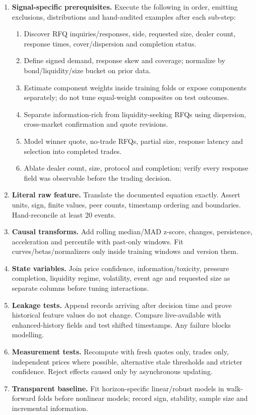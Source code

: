\documentclass[10pt]{article}
\begin{document}
\begin{enumerate}[leftmargin=2em,label=\textbf{A\arabic*.}]
\item \textbf{Signal-specific prerequisites.} Execute the following in order, emitting exclusions, distributions and hand-audited examples after each sub-step:
\begin{enumerate}[label=\alph*)]
\item Discover RFQ inquiries/responses, side, requested size, dealer count, response times, cover/dispersion and completion status.
\item Define signed demand, response skew and coverage; normalize by bond/liquidity/size bucket on prior data.
\item Estimate component weights inside training folds or expose components separately; do not tune equal-weight composites on test outcomes.
\item Separate information-rich from liquidity-seeking RFQs using dispersion, cross-market confirmation and quote revisions.
\item Model winner quote, no-trade RFQs, partial size, response latency and selection into completed trades.
\item Ablate dealer count, size, protocol and completion; verify every response field was observable before the trading decision.
\end{enumerate}
\item \textbf{Literal raw feature.} Translate the documented equation exactly. Assert units, sign, finite values, peer counts, timestamp ordering and boundaries. Hand-reconcile at least 20 events.
\item \textbf{Causal transforms.} Add rolling median/MAD z-score, changes, persistence, acceleration and percentile with past-only windows. Fit curves/betas/normalizers only inside training windows and version them.
\item \textbf{State variables.} Join price confidence, information/toxicity, pressure completion, liquidity regime, volatility, event age and requested size as separate columns before tuning interactions.
\item \textbf{Leakage tests.} Append records arriving after decision time and prove historical feature values do not change. Compare live-available with enhanced-history fields and test shifted timestamps. Any failure blocks modelling.
\item \textbf{Measurement tests.} Recompute with fresh quotes only, trades only, independent prices where possible, alternative stale thresholds and stricter confidence. Reject effects caused only by asynchronous updating.
\item \textbf{Transparent baseline.} Fit horizon-specific linear/robust models in walk-forward folds before nonlinear models; record sign, stability, sample size and incremental information.

\end{enumerate}
\end{document}
